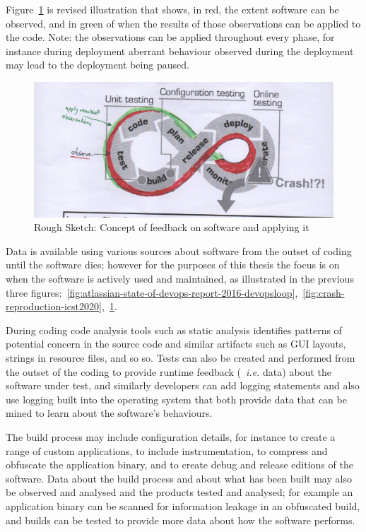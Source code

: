 Figure~\ref{fig:oberve-and-apply-devops-loop} is revised illustration that shows, in red, the extent software can be observed, and in green of when the results of those observations can be applied to the code. Note: the observations can be applied throughout every phase, for instance during deployment aberrant behaviour observed during the deployment may lead to the deployment being paused.

\begin{figure}
    \includegraphics[width=\linewidth]{images/rough-sketches/hack-of-devops-crash-figure.pdf}
    \caption{Rough Sketch: Concept of feedback on software and applying it}
    \label{fig:oberve-and-apply-devops-loop}
\end{figure}

Data is available using various sources about software from the outset of coding until the software dies; however for the purposes of this thesis the focus is on when the software is actively used and maintained, as illustrated in the previous three figures:~\ref{fig:atlassian-state-of-devops-report-2016-devopsloop},~\ref{fig:crash-reproduction-icst2020},~\ref{fig:oberve-and-apply-devops-loop}. 

During coding code analysis tools such as static analysis identifies patterns of potential concern in the source code and similar artifacts such as GUI layouts, strings in resource files, and so so. Tests can also be created and performed from the outset of the coding to provide runtime feedback (~\emph{i.e.} data) about the software under test, and similarly developers can add logging statements and also use logging built into the operating system that both provide data that can be mined to learn about the software's behaviours.

The build process may include configuration details, for instance to create a range of custom applications, to include instrumentation, to compress and obfuscate the application binary, and to create debug and release editions of the software. Data about the build process and about what has been built may also be observed and analysed and the products tested and analysed; for example an application binary can be scanned for information leakage in an obfuscated build, and builds can be tested to provide more data about how the software performs.

